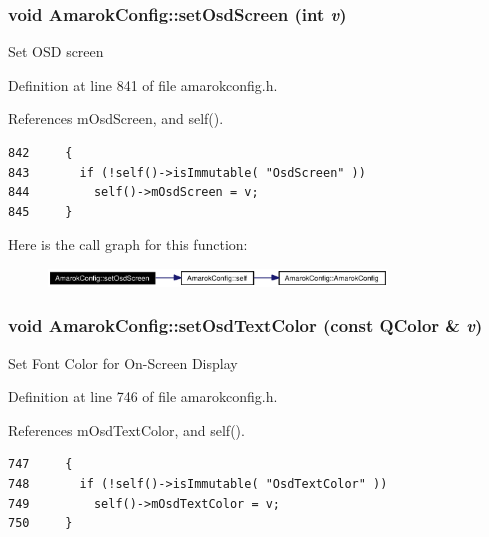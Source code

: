\subsubsection{\setlength{\rightskip}{0pt plus 5cm}void Amarok\-Config::set\-Osd\-Screen (int {\em v})\hspace{0.3cm}{\tt  [inline, static]}}\label{classAmarokConfig_AmarokConfige87}


Set OSD screen 

Definition at line 841 of file amarokconfig.h.

References m\-Osd\-Screen, and self().



\footnotesize\begin{verbatim}842     {
843       if (!self()->isImmutable( "OsdScreen" ))
844         self()->mOsdScreen = v;
845     }
\end{verbatim}\normalsize 


Here is the call graph for this function:\begin{figure}[H]
\begin{center}
\leavevmode
\includegraphics[width=255pt]{classAmarokConfig_AmarokConfige87_cgraph}
\end{center}
\end{figure}
\subsubsection{\setlength{\rightskip}{0pt plus 5cm}void Amarok\-Config::set\-Osd\-Text\-Color (const QColor \& {\em v})\hspace{0.3cm}{\tt  [inline, static]}}\label{classAmarokConfig_AmarokConfige77}


Set Font Color for On-Screen Display 

Definition at line 746 of file amarokconfig.h.

References m\-Osd\-Text\-Color, and self().



\footnotesize\begin{verbatim}747     {
748       if (!self()->isImmutable( "OsdTextColor" ))
749         self()->mOsdTextColor = v;
750     }
\end{verbatim}\normalsize 


